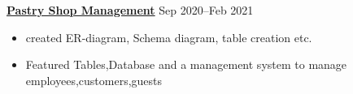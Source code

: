 \textbf{\href{https://github.com/tanjet/pastryshopmanagement}{Pastry Shop Management}} \hfill Sep 2020--Feb 2021\par
\begin{itemize}
	\item created ER-diagram, Schema diagram, table creation etc.
	\item Featured Tables,Database and a management system to manage employees,customers,guests
\end{itemize}\vspace{0.1cm}\par